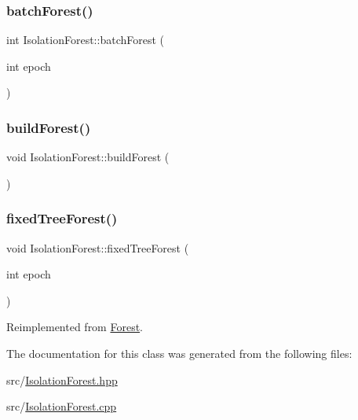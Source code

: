 \subsubsection{\texorpdfstring{batch\+Forest()}{batchForest()}}
{\footnotesize\ttfamily int Isolation\+Forest\+::batch\+Forest (\begin{DoxyParamCaption}\item[{int}]{epoch }\end{DoxyParamCaption})}

\mbox{\label{classIsolationForest_a82005a7421ba74d37f7b5d24949c9e91}} 
\subsubsection{\texorpdfstring{build\+Forest()}{buildForest()}}
{\footnotesize\ttfamily void Isolation\+Forest\+::build\+Forest (\begin{DoxyParamCaption}{ }\end{DoxyParamCaption})}

\mbox{\label{classIsolationForest_a252267bf58f8bb812c4dca47d5390709}} 
\subsubsection{\texorpdfstring{fixed\+Tree\+Forest()}{fixedTreeForest()}}
{\footnotesize\ttfamily void Isolation\+Forest\+::fixed\+Tree\+Forest (\begin{DoxyParamCaption}\item[{int}]{epoch }\end{DoxyParamCaption})\hspace{0.3cm}{\ttfamily [virtual]}}



Reimplemented from \hyperlink{classForest_a0699073aa8d6b46fdbdc36b7299a1a34}{Forest}.



The documentation for this class was generated from the following files\+:\begin{DoxyCompactItemize}
\item 
src/\hyperlink{IsolationForest_8hpp}{Isolation\+Forest.\+hpp}\item 
src/\hyperlink{IsolationForest_8cpp}{Isolation\+Forest.\+cpp}\end{DoxyCompactItemize}
